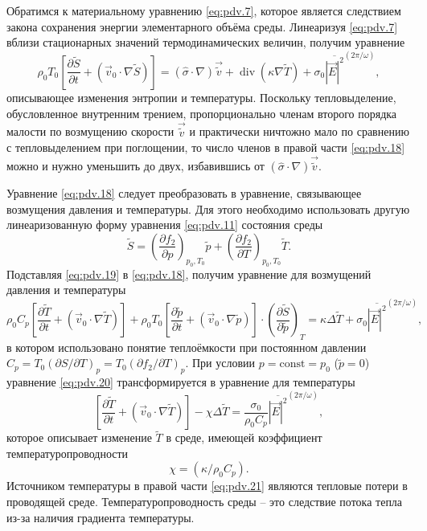 Обратимся к материальному уравнению \eqref{eq:pdv.7}, которое является следствием закона сохранения энергии элементарного объёма среды. Линеаризуя \eqref{eq:pdv.7} вблизи стационарных значений термодинамических величин, получим уравнение
\begin{equation}
	\label{eq:pdv.18}
	\rho_{0} T_{0}\left[\frac{\partial \tilde{S}}{\partial t}+\left(\vec{v}_{0} \cdot \nabla \tilde{S}\right)\right]=(\hat{\sigma} \cdot \nabla) \vec{\tilde{v}}+\operatorname{div}(\kappa \nabla \tilde{T})+\sigma_{0} \overline{|\vec{E}|^{2}}^{(2\pi/\omega)},
\end{equation}
описывающее изменения энтропии и температуры. Поскольку тепловыделение, обусловленное внутренним трением, пропорционально членам второго порядка малости по возмущению скорости $\vec{\tilde{v}}$ и практически ничтожно мало по сравнению с тепловыделением при поглощении, то число членов в правой части \eqref{eq:pdv.18} можно и нужно уменьшить до двух, избавившись от $(\hat{\sigma} \cdot \nabla)\vec{\tilde{v}}$.

Уравнение \eqref{eq:pdv.18} следует преобразовать в уравнение, связывающее возмущения давления и температуры. Для этого необходимо использовать другую линеаризованную форму уравнения \eqref{eq:pdv.11} состояния среды
\begin{equation}
	\label{eq:pdv.19}
	\tilde{S}=\left(\frac{\partial f_{2}}{\partial p}\right)_{p_{0}, T_{0}} \tilde{p}+\left(\frac{\partial f_{2}}{\partial T}\right)_{p_{0}, T_{0}} \tilde{T}.
\end{equation}
Подставляя \eqref{eq:pdv.19} в \eqref{eq:pdv.18}, получим уравнение для возмущений давления и температуры
\begin{equation}
	\label{eq:pdv.20}
	\rho_{0} C_{p}\left[\frac{\partial \tilde{T}}{\partial t}+\left(\vec{v}_{0} \cdot \nabla \tilde{T}\right)\right]+\rho_{0} T_{0}\left[\frac{\partial \tilde{p}}{\partial t}+\left(\vec{v}_{0} \cdot \nabla \tilde{p}\right)\right] \cdot\left(\frac{\partial \tilde{S}}{\partial \tilde{p}}\right)_{T}=\kappa \Delta \tilde{T}+\sigma_{0} \overline{|\vec{E}|^{2}}^{(2 \pi / \omega)},
\end{equation}
в котором использовано понятие теплоёмкости при постоянном давлении $C_p = T_0 (\partial S  / \partial T)_p  = T_0 (\partial f_2  / \partial T)_p$. При условии $p = \mathrm{const} = p_0 $ ($\tilde{p}=0$) уравнение \eqref{eq:pdv.20} трансформируется в уравнение для температуры
\begin{equation}
	\label{eq:pdv.21}
	\left[\frac{\partial \tilde{T}}{\partial t}+\left(\vec{v}_{0} \cdot \nabla \tilde{T}\right)\right]-\chi \Delta \tilde{T}=\frac{\sigma_{0}}{\rho_{0} C_{p}} \overline{|\vec{E}|^{2}}^{(2 \pi / \omega)},
\end{equation}
которое описывает изменение $\tilde{T}$ в среде, имеющей коэффициент температуропроводности
\begin{equation}
	\label{eq:pdv.22}
	\chi=\left(\kappa / \rho_{0} C_{p}\right).
\end{equation}
Источником температуры в правой части \eqref{eq:pdv.21} являются тепловые потери в проводящей среде. Температуропроводность среды -- это следствие потока тепла из-за наличия градиента температуры.



